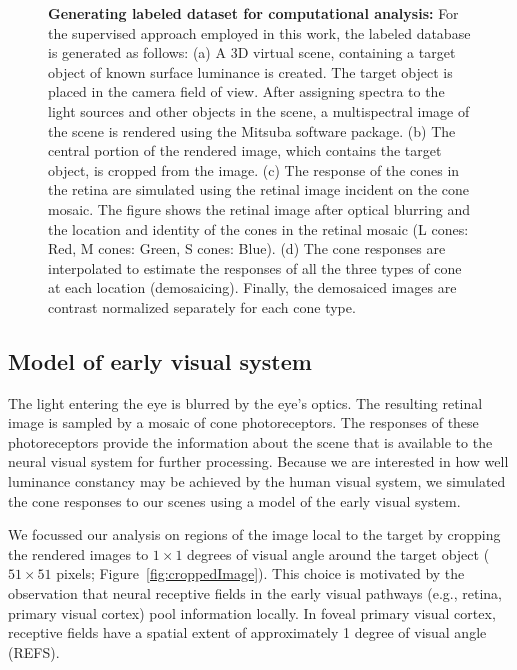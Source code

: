 \documentclass{jov}
\begin{document}
\begin{figure}
\begin{subfigure}[b]{0.2 \textwidth}
        \label{fig:coneContrast}
    \end{subfigure}
    \label{fig:sceneWithCroppedImage}
    \caption{{\bf Generating labeled dataset for computational analysis:}  For the supervised approach employed in this work, the labeled database is generated as follows: (a) A 3D virtual scene, containing a target object of known surface luminance is created. The target object is placed in the camera field of view. After assigning spectra to the light sources and other objects in the scene, a multispectral image of the scene is rendered using the Mitsuba software package. (b) The central portion of the rendered image, which contains the target object, is cropped from the image. (c) The response of the cones in the retina are simulated using the retinal image incident on the cone mosaic. The figure shows the retinal image after optical blurring and the location and identity of the cones in the retinal mosaic (L cones: Red, M cones: Green, S cones: Blue).  (d) The cone responses are interpolated to estimate the responses of all the three types of cone at each location (demosaicing). Finally, the demosaiced images are contrast normalized separately for each cone type.}
\end{figure}

\subsection{Model of early visual system} \label{method:Isetbio}
The light entering the eye is blurred by the eye's optics.
The resulting retinal image is sampled by a mosaic of cone photoreceptors.
The responses of these photoreceptors provide the information about the scene that is available to the neural visual system for further processing.
Because we are interested in how well luminance constancy may be achieved by the human visual system, we simulated the cone responses
to our scenes using a model of the early visual system.

We focussed our analysis on regions of the image local to the target by cropping the rendered images to $1 \times 1$ degrees of visual angle around the target object ($51 \times 51$ pixels; Figure~\ref{fig:croppedImage}).
This choice is motivated by the observation that neural receptive fields in the early visual pathways (e.g., retina, primary visual cortex) pool information locally.
In foveal primary visual cortex, receptive fields have a spatial extent of approximately 1 degree of visual angle (REFS).
\end{document}
